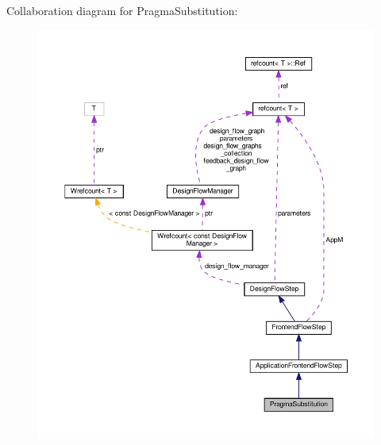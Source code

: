 Collaboration diagram for Pragma\+Substitution\+:
\nopagebreak
\begin{figure}[H]
\begin{center}
\leavevmode
\includegraphics[width=350pt]{d1/de6/classPragmaSubstitution__coll__graph}
\end{center}
\end{figure}

